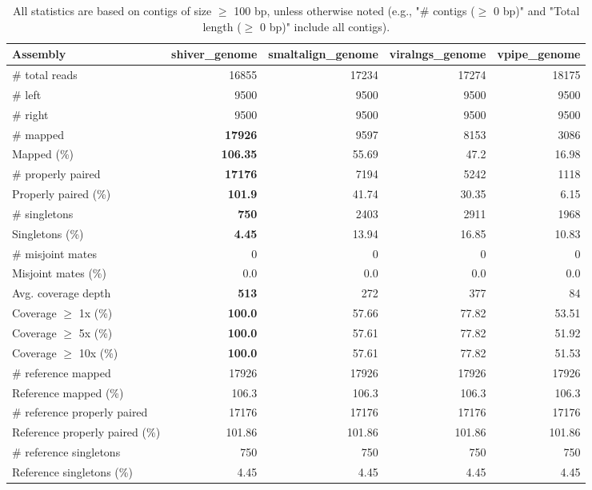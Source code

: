 \documentclass[12pt,a4paper]{article}
\begin{document}
\begin{table}[ht]
\begin{center}
\caption{All statistics are based on contigs of size $\geq$ 100 bp, unless otherwise noted (e.g., "\# contigs ($\geq$ 0 bp)" and "Total length ($\geq$ 0 bp)" include all contigs).}
\begin{tabular}{|l*{4}{|r}|}
\hline
Assembly & shiver\_genome & smaltalign\_genome & viralngs\_genome & vpipe\_genome \\ \hline
\# total reads & 16855 & 17234 & 17274 & 18175 \\ \hline
\# left & 9500 & 9500 & 9500 & 9500 \\ \hline
\# right & 9500 & 9500 & 9500 & 9500 \\ \hline
\# mapped & {\bf 17926} & 9597 & 8153 & 3086 \\ \hline
Mapped (\%) & {\bf 106.35} & 55.69 & 47.2 & 16.98 \\ \hline
\# properly paired & {\bf 17176} & 7194 & 5242 & 1118 \\ \hline
Properly paired (\%) & {\bf 101.9} & 41.74 & 30.35 & 6.15 \\ \hline
\# singletons & {\bf 750} & 2403 & 2911 & 1968 \\ \hline
Singletons (\%) & {\bf 4.45} & 13.94 & 16.85 & 10.83 \\ \hline
\# misjoint mates & 0 & 0 & 0 & 0 \\ \hline
Misjoint mates (\%) & 0.0 & 0.0 & 0.0 & 0.0 \\ \hline
Avg. coverage depth & {\bf 513} & 272 & 377 & 84 \\ \hline
Coverage $\geq$ 1x (\%) & {\bf 100.0} & 57.66 & 77.82 & 53.51 \\ \hline
Coverage $\geq$ 5x (\%) & {\bf 100.0} & 57.61 & 77.82 & 51.92 \\ \hline
Coverage $\geq$ 10x (\%) & {\bf 100.0} & 57.61 & 77.82 & 51.53 \\ \hline
\# reference mapped & 17926 & 17926 & 17926 & 17926 \\ \hline
Reference mapped (\%) & 106.3 & 106.3 & 106.3 & 106.3 \\ \hline
\# reference properly paired & 17176 & 17176 & 17176 & 17176 \\ \hline
Reference properly paired (\%) & 101.86 & 101.86 & 101.86 & 101.86 \\ \hline
\# reference singletons & 750 & 750 & 750 & 750 \\ \hline
Reference singletons (\%) & 4.45 & 4.45 & 4.45 & 4.45 \\ \hline

\end{tabular}
\end{center}
\end{table}
\end{document}
